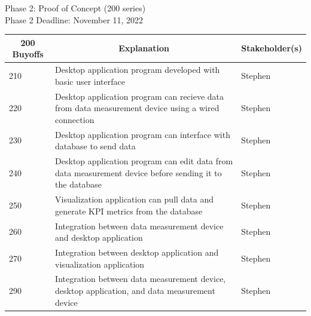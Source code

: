 \documentclass[12pt]{article}
\begin{document}
Phase 2: Proof of Concept (200 series)\\
Phase 2 Deadline: November 11, 2022\\
\begin{table}[H]
  \centering
  \begin{tabular}{|p{2cm}|p{10cm}|p{2cm}|}
  \hline
  \multicolumn{1}{|c|}{\textbf{200 Buyoffs}} & \multicolumn{1}{c|}{\textbf{Explanation}} & \multicolumn{1}{|c|}{\textbf{Stakeholder(s)}}
  \\ \hline
  210
  & Desktop application program developed with basic user interface
  & Stephen
  \newline                                
  
  \\ \hline
  220                              
  & Desktop application program can recieve data from data measurement device using a wired connection
  & Stephen
  \newline                                

  \\ \hline
  230                          
  & Desktop application program can interface with database to send data
  & Stephen
  \newline                                

  \\ \hline
  240                                
  & Desktop application program can edit data from data measurement device before sending it to the database
  & Stephen 
  \newline                            

    \\ \hline
  250                                
  & Visualization application can pull data and generate KPI metrics from the database
  & Stephen 
  \newline 

  \\ \hline
  260                                
  & Integration between data measurement device and desktop application
  & Stephen 
  \newline 

  \\ \hline
  270                                
  & Integration between desktop application and visualization application
  & Stephen 
  \newline 

  \\ \hline
  290                                
  & Integration between data measurement device, desktop application, and data measurement device
  & Stephen 
  \newline 
  \\ \hline


  \end{tabular}
\end{table}
\end{document}
